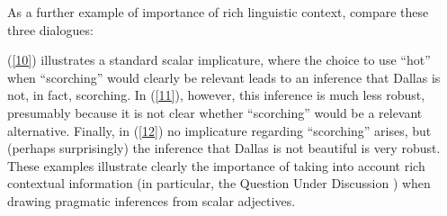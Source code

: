\documentclass[10pt]{article}
\begin{document}
As a further example of importance of rich linguistic context, compare these three dialogues: 
\begin{multicols}{3}
\end{multicols}
(\ref{10}) illustrates a standard scalar implicature, where the choice to use ``hot'' when ``scorching'' would clearly be relevant leads to an inference that Dallas is not, in fact, scorching. In (\ref{11}), however, this inference is much less robust, presumably because it is not clear whether ``scorching'' would be a relevant alternative. Finally, in (\ref{12}) no implicature regarding ``scorching'' arises, but (perhaps surprisingly) the inference that Dallas is not beautiful is very robust. These examples illustrate clearly the importance of taking into account rich contextual information (in particular, the Question Under Discussion \cite{ginzburg1995resolving,roberts1996information}) when drawing pragmatic inferences from scalar adjectives.

\end{document}
